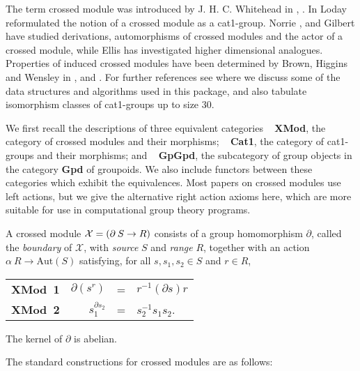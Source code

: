 

The term crossed module was introduced by J. H. C. Whitehead in
\cite{xmodW2}, \cite{xmodW1}. In \cite{xmodL1} Loday reformulated the notion of a 
crossed  module  as a   cat1-group.  Norrie \cite{xmodN1},   \cite{xmodN2} and
Gilbert \cite{xmodG1} have studied  derivations, automorphisms  of crossed
modules and the actor of  a crossed module,  while Ellis \cite{xmodE1} has
investigated   higher dimensional analogues.    Properties  of induced
crossed modules have been determined  by Brown, Higgins and Wensley in
\cite{xmodBH1},  \cite{xmodBW1}  and \cite{xmodBW2}.    For further references see
\cite{xmodAW1} where we discuss some of the data structures and algorithms
used in this  package,  and  also   tabulate isomorphism   classes  of
cat1-groups up to size $30$.

We first recall the descriptions of three equivalent categories\: ~
\textbf{XMod}, the category of crossed modules and their morphisms; ~
\textbf{Cat1}, the category of cat1-groups and their morphisms; and ~
\textbf{GpGpd}, the subcategory of group objects in the category
\textbf{Gpd} of groupoids.
We also  include functors between  these categories which  exhibit the
equivalences.  Most papers on crossed modules use left actions, but we
give the alternative right action axioms here, which are more suitable
for use in computational group theory programs.

A crossed module  ${\cal X} =  (\partial \: S  \to R )$  consists of a
group homomorphism   $\partial  $,   called  the  {\em   boundary}  of
$\mathcal{X}$,   with {\em source} $S$   and {\em range} $R$, together
with an action  $\alpha \: R  \to \mathrm{Aut}(S)$ satisfying, for all
$s,s_1,s_2 \in S$ and $r \in R$,
\begin{center}
\begin{tabular}{c r c l }
\textbf{XMod\ 1\:} &  $\partial(s^r)$   &  =  &  $r^{-1} (\partial s) r$ \\
\textbf{XMod\ 2\:} &  $s_1^{\partial s_2}$  &  =  &  $s_2^{-1}s_1 s_2$.
\end{tabular}
\end{center}
The kernel of  $\partial$  is abelian.


The standard constructions for crossed modules are as follows:

